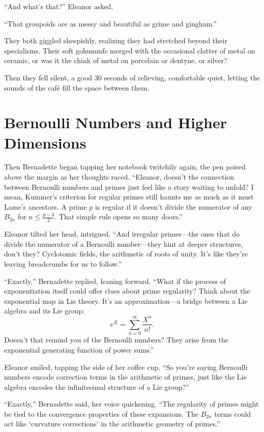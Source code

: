 “And what’s that?” Eleanor asked.

“That groupoids are as messy and beautiful as grime and gingham.”

They both giggled sheepishly, realizing they had stretched beyond their specialisms. Their soft gohummfs merged with the occasional clatter of metal on ceramic, or was it the chink of metal on porcelain or dentyne, or silver? 

Then they fell silent, a good 30 seconds of relieving, comfortable quiet, letting the sounds of the café fill the space between them.

\newpage


\section*{Bernoulli Numbers and Higher Dimensions}

Then Bernadette began tapping her notebook twitchily again, the pen poised above the margin as her thoughts raced. “Eleanor, doesn’t the connection between Bernoulli numbers and primes just feel like a story waiting to unfold? I mean, Kummer’s criterion for regular primes still haunts me as much as it must Lame's ancestors. A prime \(p\) is regular if it doesn’t divide the numerator of any \(B_{2n}\) for \(n \leq \frac{p-3}{2}\). That simple rule opens so many doors.”

Eleanor tilted her head, intrigued. “And irregular primes—the ones that do divide the numerator of a Bernoulli number—they hint at deeper structures, don’t they? Cyclotomic fields, the arithmetic of roots of unity. It’s like they’re leaving breadcrumbs for us to follow.”

“Exactly,” Bernadette replied, leaning forward. “What if the process of exponentiation itself could offer clues about prime regularity? Think about the exponential map in Lie theory. It’s an approximation—a bridge between a Lie algebra and its Lie group:
\[
e^X = \sum_{n=0}^\infty \frac{X^n}{n!}.
\]
Doesn’t that remind you of the Bernoulli numbers? They arise from the exponential generating function of power sums.”

Eleanor smiled, tapping the side of her coffee cup. “So you’re saying Bernoulli numbers encode correction terms in the arithmetic of primes, just like the Lie algebra encodes the infinitesimal structure of a Lie group?”

“Exactly,” Bernadette said, her voice quickening. “The regularity of primes might be tied to the convergence properties of these expansions. The \(B_{2n}\) terms could act like ‘curvature corrections’ in the arithmetic geometry of primes.”

